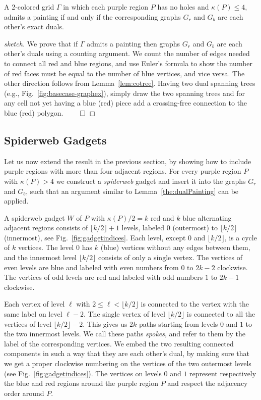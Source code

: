 \documentclass[runningheads]{llncs}
\begin{document}
\begin{lemma}\label{the:dualPainting}
A 2-colored grid $\Gamma$ in which each purple region $P$ has no holes and $\kappa(P)\leq 4$, admits a painting if and only if the corresponding graphs $G_r$ and $G_b$ are each other's exact duals.
\end{lemma}

\begin{proof}[sketch]
We prove that if $\Gamma$ admits a painting then graphs $G_r$ and $G_b$ are each other's duals using a counting argument. We count the number of edges needed to connect all red and blue regions, and use Euler's formula to show the number of red faces must be equal to the number of blue vertices, and vice versa.
The other direction follows from Lemma~\ref{lem:cotree}. Having two dual spanning trees (e.g., Fig.~\ref{fig:basecase-graphex}), simply draw the two spanning trees and for any cell not yet having a blue (red) piece add a crossing-free connection to the blue (red) polygon.
\hfill$\qed$
\end{proof}

\subsection{Spiderweb Gadgets}
\label{ssec:spiderwebs}

Let us now extend the result in the previous section, by showing how to include purple regions with more than four adjacent regions.
For every purple region $P$ with $\kappa(P) > 4$ we construct a \emph{spiderweb} gadget and insert it into the graphs $G_r$ and $G_b$, such that an argument similar to Lemma~\ref{the:dualPainting} can be applied.

A spiderweb gadget $W$ of $P$ with $\kappa(P)/2 = k$ red and $k$ blue alternating adjacent regions consists of $\lfloor k/2\rfloor + 1$ levels, labeled $0$ (outermost) to $\lfloor k/2\rfloor$ (innermost), see Fig.~\ref{fig:gadgetindices}.
Each level, except $0$ and $\lfloor k/2\rfloor$, is a cycle of $k$ vertices.
The level $0$ has $k$ (blue) vertices without any edges between them, and the innermost level $\lfloor k/2\rfloor$ consists of only a single vertex.
The vertices of even levels are blue and labeled with even numbers from $0$ to $2k-2$ clockwise.
The vertices of odd levels are red and labeled with odd numbers $1$ to $2k-1$ clockwise.

Each vertex of level $\ell $ with $2 \leq \ell < \lfloor k/2 \rfloor$ is connected to the vertex with the same label on level $\ell -2$. The single vertex of level $\lfloor k/2\rfloor$ is connected to all the vertices of level $\lfloor k/2\rfloor-2$.
This gives us $2k$ paths starting from levels $0$ and $1$ to the two innermost levels. We call these paths \emph{spokes}, and refer to them by the label of the corresponding vertices.
We embed the two resulting connected components in such a way that they are each other's dual, by making sure that we get a proper clockwise numbering on the vertices of the two outermost levels (see Fig.~\ref{fig:gadgetindices}).
The vertices on levels $0$ and $1$ represent respectively the blue and red regions around the purple region $P$ and respect the adjacency order around $P$.
\end{document}
